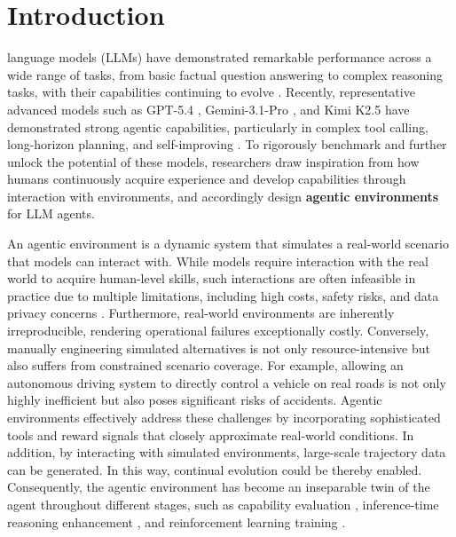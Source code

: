 \section{Introduction}
\label{sec:introduction}







 language models (LLMs) have demonstrated remarkable performance across a wide range of tasks, from basic factual question answering to complex reasoning tasks, with their capabilities continuing to evolve \cite{Qwen3,DeepSeek-R1,GEM,HLE}. Recently, representative advanced models such as GPT-5.4 \cite{gpt-5.4}, Gemini-3.1-Pro \cite{gemini3.1}, and Kimi K2.5 \cite{Kimi_K2.5} have demonstrated strong agentic capabilities, particularly in complex tool calling, long-horizon planning, and self-improving \cite{ToolRL, TravelPlanner, Self-Refine}. To rigorously benchmark and further unlock the potential of these models, researchers draw inspiration from how humans continuously acquire experience and develop capabilities through interaction with environments, and accordingly design \textbf{agentic environments} for LLM agents.



An agentic environment is a dynamic system that simulates a real-world scenario that models can interact with. While models require interaction with the real world to acquire human-level skills, such interactions are often infeasible in practice due to multiple limitations, including high costs, safety risks, and data privacy concerns \cite{Agent_world_model, RWKU, Troublemaker}. Furthermore, real-world environments are inherently irreproducible, rendering operational failures exceptionally costly. Conversely, manually engineering simulated alternatives is not only resource-intensive but also suffers from constrained scenario coverage. For example, allowing an autonomous driving system to directly control a vehicle on real roads is not only highly inefficient but also poses significant risks of accidents. Agentic environments effectively address these challenges by incorporating sophisticated tools and reward signals that closely approximate real-world conditions. In addition, by interacting with simulated environments, large-scale trajectory data can be generated. In this way, continual evolution could be thereby enabled. Consequently, the agentic environment has become an inseparable twin of the agent throughout different stages, such as capability evaluation \cite{DAComp, WebShop, SWE-Bench}, inference-time reasoning enhancement \cite{ReAct,Fixing_the_Broken_Compass,Omni-Reward}, and reinforcement learning training \cite{GRPO,DAPO,reinforce_internal,towards_agentic_llm}.

